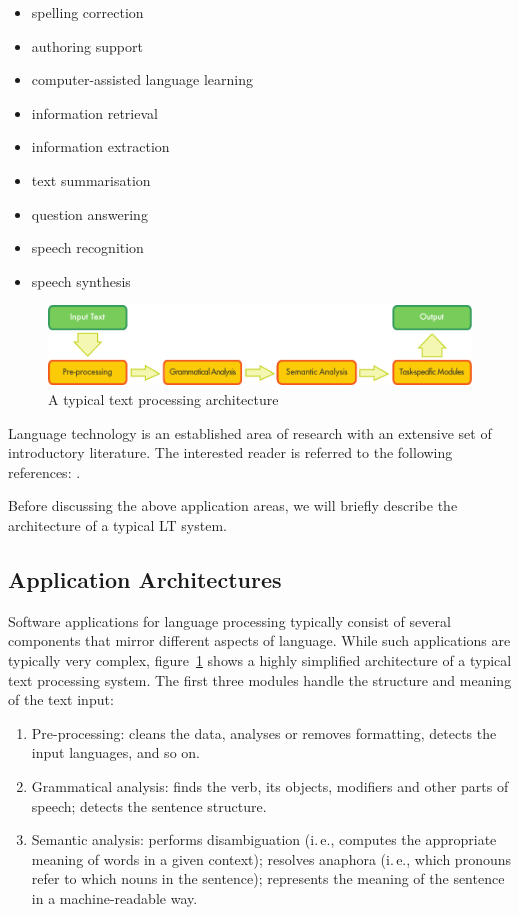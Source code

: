 \documentclass[]{../../metanetpaper}
\begin{document}
\begin{multicols}{2}
\begin{itemize}
\item spelling correction
\item authoring support
\item computer-assisted language learning
\item information retrieval 
\item information extraction
\item text summarisation
\item question answering
\item speech recognition 
\item speech synthesis 
\end{itemize}

\begin{figure}[b]
  \center
  \includegraphics[width=\textwidth]{../_media/english/text_processing_app_architecture}
  \caption{A typical text processing architecture}
  \label{fig:textprocessingarch_en}
\end{figure}

Language technology is an established area of research with an extensive set of introductory literature. The interested reader is referred to the following references:  \cite{carstensen-etal1, jurafsky-martin01, manning-schuetze1, lt-world1, lt-survey1}.

Before discussing the above application areas, we will briefly describe the architecture of a typical LT system.

\subsection{Application Architectures}

Software applications for language processing typically consist of several components that mirror different aspects of language. While such applications are typically very complex, figure~\ref{fig:textprocessingarch_en} shows a highly simplified architecture of a typical text processing system. The first three modules handle the structure and meaning of the text input:

\begin{enumerate}
\item Pre-processing: cleans the data, analyses or removes formatting, detects the input languages, and so on.
\item Grammatical analysis: finds the verb, its objects, modifiers and other parts of speech; detects the sentence structure.
\item Semantic analysis: performs disambiguation (i.\,e., computes the appropriate meaning of words in a given context); resolves anaphora (i.\,e., which pronouns refer to which nouns in the sentence); represents the meaning of the sentence in a machine-readable way.
\end{enumerate}


\end{multicols}
\end{document}
